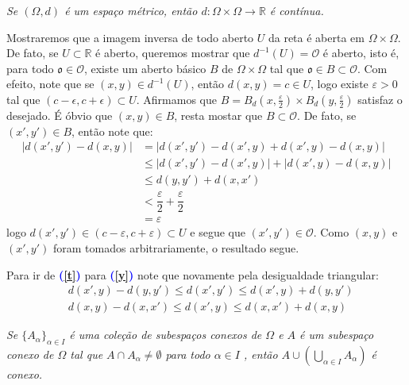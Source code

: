 \begin{lema}
\textit{Se $(\Omega, d)$ é um espaço métrico, então $d: \Omega \times \Omega \to \mathbb{R}$ é contínua.}
\end{lema}
\begin{demm}
Mostraremos que a imagem inversa de todo aberto $U$ da reta é aberta em $\Omega \times \Omega$. De fato, se $U \subset \mathbb{R}$ é aberto, queremos mostrar que $d^{-1}(U)= \mathscr{O}$ é aberto, isto é, para todo $\mathfrak{o} \in \mathscr{O} $, existe um aberto básico $B$ de $\Omega \times \Omega$ tal que $\mathfrak{o} \in  B \subset \mathscr{O} $. Com efeito, note que se $(x, y) \in d^{-1}(U)$, então $d(x, y) = c \in U$, logo existe $\varepsilon > 0$ tal que $(c - \epsilon, c + \epsilon) \subset U$. Afirmamos que $B = B_d\left(x, \frac{\varepsilon}{2} \right) \times B_d\left(y, \frac{\varepsilon}{2} \right)$ satisfaz o desejado. É óbvio que $(x, y) \in B$, resta mostar que $B\subset \mathscr{O}$. De fato, se $(x', y') \in B$, então note que:
\begin{align}
    |d(x', y') - d(x, y)| &= |d(x', y') - d(x', y) + d(x', y) - d(x, y)|\\
    &\leq |d(x', y') - d(x', y)| + |d(x', y) - d(x, y)| \label{t}\\
    &\leq d(y, y') + d(x, x')\label{y} \\
    &< \dfrac{\varepsilon}{2} + \dfrac{\varepsilon}{2}\\
    &=\varepsilon
\end{align}
logo $d(x', y') \in (c - \varepsilon, c + \varepsilon) \subset U$ e segue que $(x', y') \in \mathscr{O}$. Como $(x, y)$ e $(x', y')$ foram tomados arbitrariamente, o resultado segue.
\end{demm}
\begin{oobs} Para ir de \textcolor{blue}{\textbf{(\ref{t})}} para \textcolor{blue}{\textbf{(\ref{y})}}  note que novamente pela desigualdade triangular:
\begin{align*}
    &d(x', y) - d(y, y') \leq d(x', y') \leq d(x', y) + d(y, y')\\
    &d(x, y) - d(x, x') \leq d(x', y) \leq d(x, x') + d(x, y)
\end{align*}
\end{oobs}
\begin{lema}
\textit{Se $\{A_\alpha \}_{\alpha \in I}$ é uma coleção de subespaços conexos de $\Omega$ e $A$ é um subespaço conexo de $\Omega$ tal que $A \cap A_\alpha \neq \emptyset$ para todo $\alpha \in I$ , então $A \cup \left(\displaystyle{\bigcup_{\alpha \in I} A_\alpha} \right)$ é conexo.}
\end{lema}
